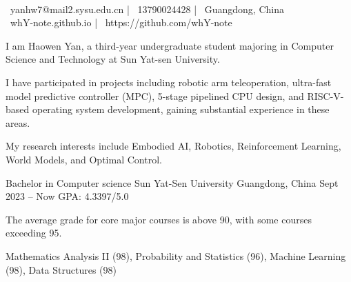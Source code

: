 \documentclass[]{awesome-cv}
\begin{document}
    
\begin{center}
	  \\
	\vspace{2mm}
	{\faEnvelope\ yanhw7@mail2.sysu.edu.cn} | {\faMobile\ 13790024428} | {\faMapMarker\ Guangdong, China} \\
	{\faLink\ whY-note.github.io} | {\faGithub\ https://github.com/whY-note}
\end{center}


{\color{text}

I am Haowen Yan, a third-year undergraduate student majoring in Computer Science and Technology at Sun Yat-sen University.

I have participated in projects including robotic arm teleoperation, ultra-fast model predictive controller (MPC), 5-stage pipelined CPU design, and RISC-V-based operating system development, gaining substantial experience in these areas.

My research interests include Embodied AI, Robotics, Reinforcement Learning, World Models, and Optimal Control.
}

\vspace{-3mm}
\begin{cventries}
	\cventry
	{Bachelor in Computer science}
	{Sun Yat-Sen University}
	{Guangdong, China}
	{Sept 2023 – Now}
	{GPA: 4.3397/5.0}

\end{cventries}

\vspace{-2mm}
{\color{text}
The average grade for core major courses is above 90, with some courses exceeding 95.
	
Mathematics Analysis II (98), Probability and Statistics (96), Machine Learning (98), Data Structures (98)
}
\end{document}
